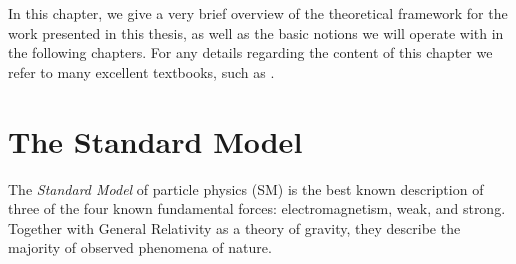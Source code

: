 \renewcommand{\L}{{\mathscr{L}}}
\newcommand{\MSbar}{$\overline{\mathrm{MS}}$}
\newcommand{\BR}{{\text{BR}}}
\newcommand{\LO}{{\text{LO}}}
\newcommand{\NLO}{{\text{NLO}}}
\newcommand{\EW}{{\text{EW}}}
\newcommand{\QCD}{{\text{QCD}}}
\newcommand{\QED}{{\text{QED}}}
\newcommand{\LEP}{{\text{LEP}}}
\newcommand{\SLD}{{\text{SLD}}}

\newcommand{\SM}{{\text{SM}}}
\newcommand{\PH}{\text{Higgs}}
\newcommand{\YM}{{\text{YM}}}
\newcommand{\Yuk}{{\text{Yukawa}}}
\newcommand{\ferm}{{\text{Matter}}}
\newcommand{\Born}{{\text{Born}}}
\newcommand{\born}{{\text{Born}}}
\newcommand{\corr}{{\text{corr}}}
\newcommand{\onel}{{\mbox{\scriptsize 1-loop}}}
\newcommand{\weak}{{\text{weak}}}
\newcommand{\gs}{g_{s}}
\newcommand{\alphas}{\alpha_{s}}
\newcommand{\muF}{\mu_{F}}
\newcommand{\muR}{\mu_{R}}
\newcommand{\sw}{\sin \theta_W}
\newcommand{\cw}{\cos \theta_W}
\newcommand{\GF}{G_\mu}

\newcommand{\Pl}{\ell}
\newcommand{\rc}{{\mathrm{c}}}
\newcommand{\rI}{{\mathrm{I}}}
\newcommand{\ri}{{\mathrm{i}}}
\newcommand{\rd}{{\mathrm{d}}}
\newcommand{\rU}{{\mathrm{U}}}
\newcommand{\rL}{{\mathrm{L}}}
\newcommand{\rR}{{\mathrm{R}}}
\newcommand{\rT}{{\mathrm{T}}}
\newcommand{\rY}{{\mathrm{Y}}}



In this chapter, we give a very brief overview of the theoretical framework
for the work presented in this thesis, as well as the basic notions we
will operate with in the following chapters.
For any details regarding the content of this chapter we refer to many excellent textbooks, such as \cite{PeskinS,Schwartz:2013pla}.


\section{The Standard Model}

The \emph{Standard Model} of particle physics (SM) is the best known description of three of the
four known fundamental forces: electromagnetism, weak, and strong.
Together with General Relativity as a theory of gravity,
they describe the majority of observed phenomena of nature.

